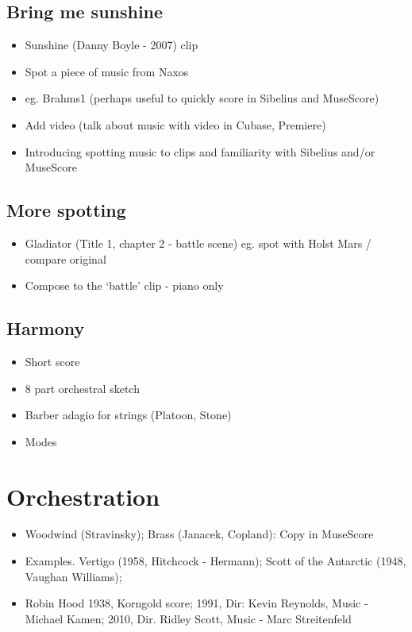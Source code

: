 \subsection{Bring me sunshine} 
\begin{itemize}
\item Sunshine (Danny Boyle - 2007) clip 
\item Spot a piece of music from Naxos 
\item eg. Brahms1 (perhaps useful to quickly score in Sibelius and MuseScore) 
\item Add video (talk about music with video in Cubase, Premiere)
\item Introducing spotting music to clips and familiarity with Sibelius and/or MuseScore
\end{itemize}


\subsection{More spotting}
\begin{itemize}
\item Gladiator (Title 1, chapter 2 - battle scene) eg. spot with Holst Mars / compare original
\item Compose to the `battle' clip - piano only
\end{itemize}

\subsection{Harmony}
\begin{itemize}
\item Short score
\item 8 part orchestral sketch
\item Barber adagio for strings (Platoon, Stone)
\item Modes
\end{itemize}

\section{Orchestration}
\begin{itemize}
\item Woodwind (Stravinsky); Brass (Janacek, Copland): Copy in MuseScore
\item Examples. Vertigo (1958, Hitchcock - Hermann); Scott of the Antarctic (1948, Vaughan Williams); 
\item Robin Hood 1938, Korngold score; 1991, Dir: Kevin Reynolds, Music - Michael Kamen; 2010, Dir. Ridley Scott, Music - Marc Streitenfeld  
\end{itemize}

